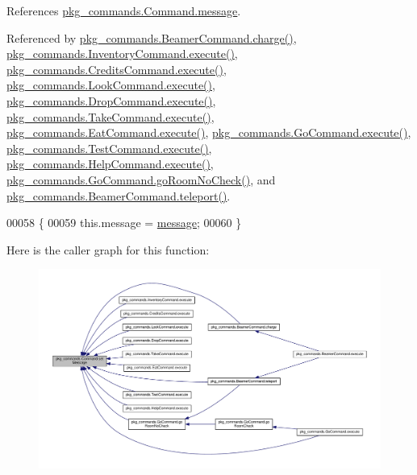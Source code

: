 References \hyperlink{Command_8java_source_l00028}{pkg\-\_\-commands.\-Command.\-message}.



Referenced by \hyperlink{BeamerCommand_8java_source_l00067}{pkg\-\_\-commands.\-Beamer\-Command.\-charge()}, \hyperlink{InventoryCommand_8java_source_l00023}{pkg\-\_\-commands.\-Inventory\-Command.\-execute()}, \hyperlink{CreditsCommand_8java_source_l00023}{pkg\-\_\-commands.\-Credits\-Command.\-execute()}, \hyperlink{LookCommand_8java_source_l00026}{pkg\-\_\-commands.\-Look\-Command.\-execute()}, \hyperlink{DropCommand_8java_source_l00027}{pkg\-\_\-commands.\-Drop\-Command.\-execute()}, \hyperlink{TakeCommand_8java_source_l00027}{pkg\-\_\-commands.\-Take\-Command.\-execute()}, \hyperlink{EatCommand_8java_source_l00028}{pkg\-\_\-commands.\-Eat\-Command.\-execute()}, \hyperlink{GoCommand_8java_source_l00028}{pkg\-\_\-commands.\-Go\-Command.\-execute()}, \hyperlink{TestCommand_8java_source_l00032}{pkg\-\_\-commands.\-Test\-Command.\-execute()}, \hyperlink{HelpCommand_8java_source_l00033}{pkg\-\_\-commands.\-Help\-Command.\-execute()}, \hyperlink{GoCommand_8java_source_l00061}{pkg\-\_\-commands.\-Go\-Command.\-go\-Room\-No\-Check()}, and \hyperlink{BeamerCommand_8java_source_l00050}{pkg\-\_\-commands.\-Beamer\-Command.\-teleport()}.


\begin{DoxyCode}
00058                                               \{
00059         this.message = \hyperlink{classpkg__commands_1_1Command_ab4bc9d76fd948fcf253400793fbfde3f}{message};
00060     \}
\end{DoxyCode}


Here is the caller graph for this function\-:\nopagebreak
\begin{figure}[H]
\begin{center}
\leavevmode
\includegraphics[width=350pt]{classpkg__commands_1_1Command_ae210ff216fe908b111ba1c988a963d13_icgraph}
\end{center}
\end{figure}


